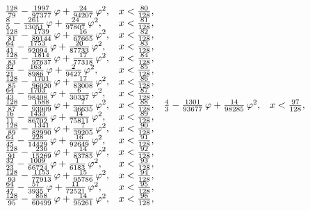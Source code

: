 \begin{equation*}
\begin{array}{@{}l l@{}}
		\frac{128}{79} - \frac{1997}{97377}\,\varphi + \frac{24}{94207}\,\varphi^2, & x < \frac{80}{128},\\
		\frac{8}{5} - \frac{261}{13051}\,\varphi + \frac{24}{97807}\,\varphi^2, & x < \frac{81}{128},\\
		\frac{128}{81} - \frac{1739}{89144}\,\varphi + \frac{16}{67665}\,\varphi^2, & x < \frac{82}{128},\\
		\frac{64}{41} - \frac{1753}{92094}\,\varphi + \frac{20}{87733}\,\varphi^2, & x < \frac{83}{128},\\
		\frac{128}{83} - \frac{1814}{97637}\,\varphi + \frac{17}{77318}\,\varphi^2, & x < \frac{84}{128},\\
		\frac{32}{21} - \frac{163}{8986}\,\varphi + \frac{2}{9427}\,\varphi^2, & x < \frac{85}{128},\\
		\frac{128}{85} - \frac{1701}{96020}\,\varphi + \frac{17}{83008}\,\varphi^2, & x < \frac{86}{128},\\
		\frac{64}{43} - \frac{1703}{98408}\,\varphi + \frac{6}{30337}\,\varphi^2, & x < \frac{87}{128},\\
		\frac{128}{87} - \frac{1588}{93909}\,\varphi + \frac{7}{36635}\,\varphi^2, & x < \frac{88}{128},\\
		\frac{16}{11} - \frac{1433}{86702}\,\varphi + \frac{14}{75811}\,\varphi^2, & x < \frac{89}{128},\\
		\frac{128}{89} - \frac{1341}{82990}\,\varphi + \frac{7}{39205}\,\varphi^2, & x < \frac{90}{128},\\
		\frac{64}{45} - \frac{228}{14429}\,\varphi + \frac{16}{92649}\,\varphi^2, & x < \frac{91}{128},\\
		\frac{128}{91} - \frac{236}{15269}\,\varphi + \frac{14}{83785}\,\varphi^2, & x < \frac{92}{128},\\
		\frac{32}{23} - \frac{1009}{66724}\,\varphi + \frac{1}{6183}\,\varphi^2, & x < \frac{93}{128},\\
		\frac{128}{93} - \frac{1153}{77913}\,\varphi + \frac{15}{95786}\,\varphi^2, & x < \frac{94}{128},\\
		\frac{64}{47} - \frac{57}{3935}\,\varphi + \frac{11}{72521}\,\varphi^2, & x < \frac{95}{128},\\
		\frac{128}{95} - \frac{858}{60499}\,\varphi + \frac{14}{95261}\,\varphi^2, & x < \frac{96}{128},\\
	\end{array}\quad
	\begin{array}{@{}l l@{}}
		\frac{4}{3} - \frac{1301}{93677}\,\varphi + \frac{14}{98285}\,\varphi^2, & x < \frac{97}{128},\\

\end{array}
\end{equation*}
